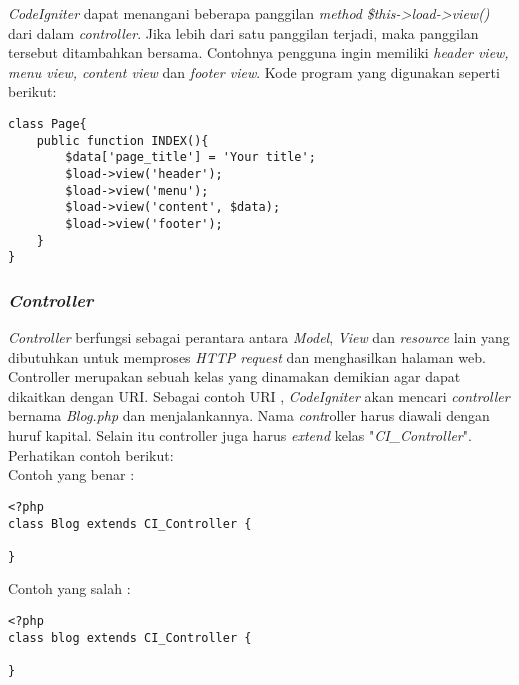 	\textit{CodeIgniter} dapat menangani beberapa panggilan \textit{method} \textit{\$this->load->view()} dari dalam \textit{controller}. Jika lebih dari satu panggilan terjadi, maka panggilan tersebut ditambahkan bersama. Contohnya pengguna ingin memiliki \textit{header view, menu view, content view} dan \textit{footer view}. Kode program yang digunakan seperti berikut:
	\begin{lstlisting}[basicstyle=\ttfamily, frame=single,
columns=fullflexible, keepspaces=true, breaklines=true]
class Page{
	public function INDEX(){
		$data['page_title'] = 'Your title';
		$load->view('header');
		$load->view('menu');
		$load->view('content', $data);
		$load->view('footer');
	}
}
\end{lstlisting}
	
	\subsubsection{\textit{Controller}}
	\textit{Controller} berfungsi sebagai perantara antara \textit{Model}, \textit{View} dan \textit{resource} lain yang dibutuhkan untuk memproses \textit{HTTP request} dan menghasilkan halaman web. Controller merupakan sebuah kelas yang dinamakan demikian agar dapat dikaitkan dengan URI. Sebagai contoh URI , \textit{CodeIgniter} akan mencari \textit{controller} bernama \textit{Blog.php} dan menjalankannya. Nama \textit{cont}roller harus diawali dengan huruf kapital. Selain itu controller juga harus \textit{extend} kelas "\textit{CI\_Controller}".
	Perhatikan contoh berikut:\\
	Contoh yang benar :
\begin{lstlisting}[basicstyle=\ttfamily, frame=single,
columns=fullflexible, keepspaces=true, breaklines=true]
<?php
class Blog extends CI_Controller {

}
\end{lstlisting}
	
	Contoh yang salah :
\begin{lstlisting}[basicstyle=\ttfamily, frame=single,
columns=fullflexible, keepspaces=true, breaklines=true]
<?php
class blog extends CI_Controller {

}
\end{lstlisting} 

